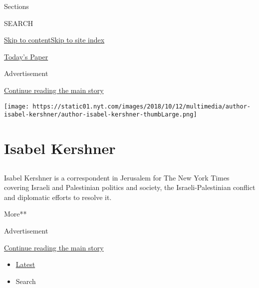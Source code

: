 Sections

SEARCH

\protect\hyperlink{site-content}{Skip to
content}\protect\hyperlink{site-index}{Skip to site index}

\href{https://myaccount.nytimes.com/auth/login?response_type=cookie\&client_id=vi}{}

\href{https://www.nytimes.com/section/todayspaper}{Today's Paper}

Advertisement

\protect\hyperlink{after-top}{Continue reading the main story}

\texttt{[image: https://static01.nyt.com/images/2018/10/12/multimedia/author-isabel-kershner/author-isabel-kershner-thumbLarge.png]}

\hypertarget{isabel-kershner}{%
\section{Isabel Kershner}\label{isabel-kershner}}

\subsection{}

Isabel Kershner is a correspondent in Jerusalem for The New York Times
covering Israeli and Palestinian politics and society, the
Israeli-Palestinian conflict and diplomatic efforts to resolve it.

More**

Advertisement

\protect\hyperlink{after-mid1}{Continue reading the main story}

\begin{itemize}
\tightlist
\item
  \protect\hyperlink{stream-panel}{Latest}
\item
  Search
\end{itemize}

